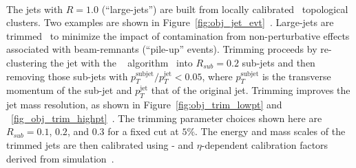 \paragraph{}
The jets with $R=1.0$ (``large-\R jets'') are built from locally calibrated~\cite{Aad:2011he} topological clusters.
Two examples are shown in Figure~\ref{fig:obj_jet_evt}~\cite{ATLAS-CONF-2015-035}.
Large-\R jets are trimmed~\cite{Krohn2010} to minimize the impact of contamination from non-perturbative effects associated with beam-remnants (``pile-up'' events).
Trimming proceeds by re-clustering the jet with the \kt~ algorithm~\cite{Ellis:1993tq} into $R_{sub} = 0.2$ sub-jets and then removing those sub-jets with $p_T^{\mathrm{subjet}}/p_T^{\mathrm{jet}} < 0.05$, where $p_T^{\mathrm{subjet}}$ is the transverse momentum of the sub-jet and $p_T^{\mathrm{jet}}$ that of the original jet.
Trimming improves the jet mass resolution, as shown in Figure~\ref{fig:obj_trim_lowpt} and ~\ref{fig_obj_trim_highpt}~\cite{ATL-PHYS-PUB-2017-020}. 
The trimming parameter choices shown here are $R_{sub} = 0.1$, $0.2$, and $0.3$ for a fixed cut at $5\%$.
The energy and mass scales of the trimmed jets are then calibrated using \pt- and $\eta$-dependent calibration factors derived from simulation~\cite{PERF-2012-02}.

